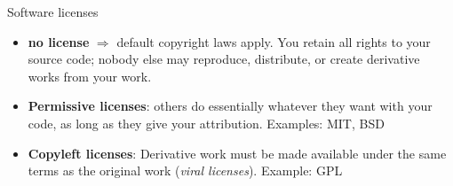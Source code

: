 \documentclass[compress]{beamer}
\begin{document}
\begin{frame}{Software licenses}
    \begin{itemize}
        \item<+-> {\bf no license} $\Rightarrow$ default copyright laws apply.
            You retain all rights to your source code; nobody else may
            reproduce, distribute, or create derivative works from your work.
        \item<+-> {\bf Permissive licenses}: others do essentially whatever they
            want with your code, as long as they give your attribution.
            Examples: MIT, BSD
        \item<+-> {\bf Copyleft licenses}: Derivative work must be made
            available under the same terms as the original work (\emph{viral
            licenses}). Example: GPL
    \end{itemize}



\end{frame}
\end{document}
